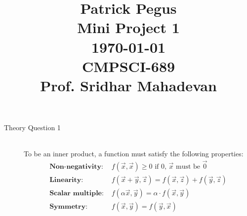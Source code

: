 \documentclass{article}
\newcommand*{\X}{\Vec{x}}
\newcommand*{\Y}{\Vec{y}}
\newcommand*{\Z}{\Vec{z}}
\newcommand*{\0}{\Vec{0}}
\newcommand*{\norm}[1]{\lVert#1\rVert_2}
\newcommand*{\al}{\alpha}
\newcommand*{\be}{\beta}
\newcommand*{\de}{\delta}
\newcommand*{\om}{\omega}
\begin{document}
\title
{\begin{flushleft}
\large
Patrick Pegus\\
Mini Project 1\\
\today\\
CMPSCI-689\\
Prof. Sridhar Mahadevan
\end{flushleft}}
\author{}
\date{}
\maketitle
\normalsize
\begin{description}
	\item[Theory Question 1] \hfill \\
		To be an inner product, a function must satisfy the following properties:
		\begin{align*}
			\textbf{Non-negativity: }&f(\X,\X) \ge 0 \text{ if $0$, $\X$ must be } \0 \\
			\textbf{Linearity: }&f(\X+\Y,\Z)=f(\X,\Z)+f(\Y,\Z) \\
			\textbf{Scalar multiple: }&f(\al\X,\Y)=\al \cdot f(\X,\Y) \\
			\textbf{Symmetry: }&f(\X,\Y)=f(\Y,\X)
		\end{align*}

\end{description}
\end{document}
